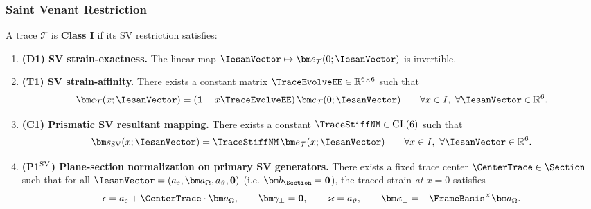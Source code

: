 \subsubsection{Saint Venant Restriction}

  


\begin{definition}[Class I]
\label{def:classI-minimal}
A trace $\mathcal T$ is \textbf{Class I} if its SV restriction satisfies:

\begin{enumerate}[label=(\roman*)]
\item \textbf{(D1) SV strain-exactness.}
The linear map $\IesanVector\mapsto \bm e_{\mathcal T}(0;\IesanVector)$ is invertible.

\item \textbf{(T1) SV strain-affinity.}
There exists a constant matrix $\TraceEvolveEE\in\mathbb R^{6\times 6}$ such that
\[
  \bm e_{\mathcal T}(x;\IesanVector) = (\mathbf 1+x\TraceEvolveEE)\,\bm e_{\mathcal T}(0;\IesanVector)
  \qquad \forall x\in I,\ \forall \IesanVector\in\mathbb R^6.
\]

\item \textbf{(C1) Prismatic SV resultant mapping.}
There exists a constant $\TraceStiffNM\in\mathrm{GL}(6)$ such that
\[
  \bm s_{\rm SV}(x;\IesanVector)=\TraceStiffNM\,\bm e_{\mathcal T}(x;\IesanVector)
  \qquad \forall x\in I,\ \forall \IesanVector\in\mathbb R^6.
\]

\item \textbf{(P1${}^{\rm SV}$) Plane-section normalization on primary SV generators.}
There exists a fixed trace center $\CenterTrace\in\Section$ such that for all
$\IesanVector=(a_\varepsilon,\bm a_\Omega,a_\vartheta,\mathbf 0)$ (i.e. $\bm b_\Section=\mathbf 0$),
the traced strain \emph{at $x=0$} satisfies
\[
  \epsilon = a_\varepsilon+\CenterTrace\cdot \bm a_\Omega,\qquad
  \bm\gamma_\perp=\mathbf 0,\qquad
  \varkappa=a_\vartheta,\qquad
  \bm\kappa_\perp=-\FrameBasis^\times \bm a_\Omega.
\]
\end{enumerate}
\end{definition}

